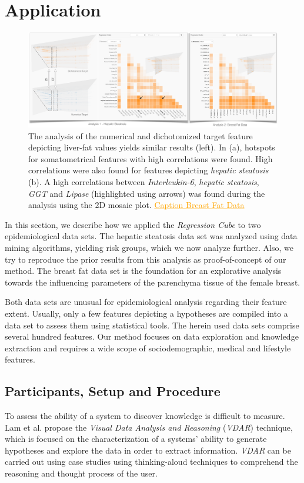 \documentclass[journal]{style/vgtc} 			          %
\newcommand{\com}[1]{\textcolor{orange}{\uline{#1}}}
\begin{document}
\section{Application} \label{application}
\begin{figure}[htb]
 \centering
 \includegraphics[width=7.0in]{figures/application}
 \caption{
 The analysis of the numerical and dichotomized target feature depicting liver-fat values yields similar results (left).
 In (a), hotspots for somatometrical features with high correlations were found.
 High correlations were also found for features depicting \emph{hepatic steatosis} (b).
 A high correlations between \emph{Interleukin-6}, \emph{hepatic steatosis}, \emph{GGT} and \emph{Lipase} (highlighted using arrows) was found during the analysis using the 2D mosaic plot.
 \com{Caption Breast Fat Data}
 }
  \label{fig:Application}
\end{figure}
In this section, we describe how we applied the \emph{Regression Cube} to two epidemiological data sets.
The hepatic steatosis data set was analyzed using data mining algorithms, yielding risk groups, which we now analyze further.
Also, we try to reproduce the prior results from this analysis as proof-of-concept of our method.
The breast fat data set is the foundation for an explorative analysis towards the influencing parameters of the parenchyma tissue of the female breast.

Both data sets are unusual for epidemiological analysis regarding their feature extent.
Usually, only a few features depicting a hypotheses are compiled into a data set to assess them using statistical tools.
The herein used data sets comprise several hundred features.
Our method focuses on data exploration and knowledge extraction and requires a wide scope of sociodemographic, medical and lifestyle features.
\subsection{Participants, Setup and Procedure}
To assess the ability of a system to discover knowledge is difficult to measure.
Lam et al. \cite{Lam2012} propose the \emph{Visual Data Analysis and Reasoning} (\emph{VDAR}) technique, which is focused on the characterization of a systems' ability to generate hypotheses and explore the data in order to extract information.
\emph{VDAR} can be carried out using case studies using thinking-aloud techniques to comprehend the reasoning and thought process of the user.
\end{document}
